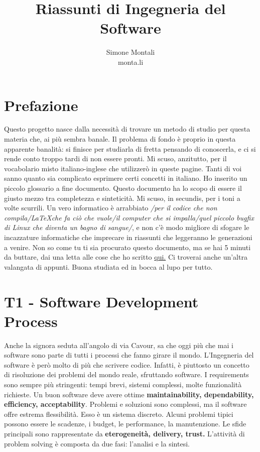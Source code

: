 \documentclass[11pt]{article}
\begin{document}
\author{Simone Montali\\monta.li}
\title{Riassunti di Ingegneria del Software}

\maketitle

\medskip
\section*{Prefazione}
Questo progetto nasce dalla necessità di trovare un metodo di studio per questa materia che, ai più sembra banale. Il problema di fondo è proprio in questa apparente banalità: si finisce per studiarla di fretta pensando di conoscerla, e ci si rende conto troppo tardi di non essere pronti. Mi scuso, anzitutto, per il vocabolario misto italiano-inglese che utilizzerò in queste pagine. Tanti di voi sanno quanto sia complicato esprimere certi concetti in italiano. Ho inserito un piccolo glossario a fine documento. Questo documento ha lo scopo di essere il giusto mezzo tra completezza e sinteticità. Mi scuso, in secundis, per i toni a volte scurrili. Un vero informatico è arrabbiato \textit{/per il codice che non compila/\LaTeX  che fa ciò che vuole/il computer che si impalla/quel piccolo bugfix di Linux che diventa un bagno di sangue/}, e non c'è modo migliore di sfogare le incazzature informatiche che imprecare in riassunti che leggeranno le generazioni a venire. 
Non so come tu ti sia procurato questo documento, ma se hai 5 minuti da buttare, dai una letta alle cose che ho scritto \href{https://monta.li/appunti}{qui.} Ci troverai anche un'altra valangata di appunti. Buona studiata ed in bocca al lupo per tutto.
\section{T1 - Software Development Process}
Anche la signora seduta all'angolo di via Cavour, sa che oggi più che mai i software sono parte di tutti i processi che fanno girare il mondo. L'Ingegneria del software è però molto di più che scrivere codice. Infatti, è piuttosto un concetto di risoluzione dei problemi del mondo reale, sfruttando software. I requirements sono sempre più stringenti: tempi brevi, sistemi complessi, molte funzionalità richieste. Un buon software deve avere ottime \textbf{maintainability, dependability, efficiency, acceptability}. Problemi e soluzioni sono complessi, ma il software offre estrema flessibilità. Esso è un sistema discreto. Alcuni problemi tipici possono essere le scadenze, i budget, le performance, la manutenzione. Le sfide principali sono rappresentate da \textbf{eterogeneità, delivery, trust.} L'attività di problem solving è composta da due fasi: l'analisi e la sintesi. 
\end{document}
